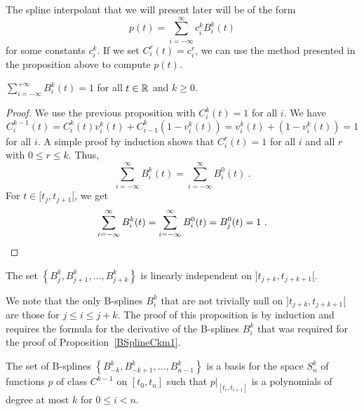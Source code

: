 \begin{rmk}
The spline interpolant that we will present later will be
of the form
\[
  p(t) = \sum_{i=-\infty}^\infty  c_i^k B_i^k(t)
\]
for some constants $c_i^k$.  If we set $C_i^r(t) = c_i^r$, we can use
the method presented in the proposition above to compute $p(t)$.
\end{rmk}

\begin{prop}
$\displaystyle \sum_{i=-\infty}^{+\infty} B_i^k(t) = 1$ for all $t \in \mathbb{R}$
and $k\geq 0$.
\label{Bsplinesum1}
\end{prop}

\begin{proof}
We use the previous proposition with $C_i^k(t) = 1$ for all $i$.  We
have
\[
C_i^{k-1}(t) = C_i^k(t) v_i^k(t) + C_{i-1}^k \left( 1- v_i^k(t)\right)
=  v_i^k(t) + \left( 1-  v_i^k(t)\right) = 1
\]
for all $i$.   A simple proof by induction shows that
$C_i^r(t) = 1$ for all $i$ and all $r$ with $0 \leq r \leq k$.  Thus,
\[
  \sum_{i=-\infty}^\infty B_i^k(t) = \sum_{i=-\infty}^\infty B_i^0(t) \ .
\]
For $t\in [t_j,t_{j+1}[$, we get
\[
  \sum_{i=-\infty}^\infty B_i^k(t) = \sum_{i=-\infty}^\infty B_i^0(t)
  = B_j^0(t) = 1 \ .  \qedhere
\]
\end{proof}

\begin{prop}
The set
$\displaystyle \left\{ B_j^k, B_{j+1}^k, \ldots , B_{j+k}^k \right\}$
is linearly independent on $]t_{j+k},t_{j+k+1}[$.
\end{prop}

We note that the only B-splines $B_i^k$ that are not trivially null on
$]t_{j+k},t_{j+k+1}[$ are those for $j \leq i \leq j+k$.  The proof of
this proposition is by induction and requires the formula for the
derivative of the B-splines $B_i^k$ that was required for the proof
of Proposition~\ref{BSplineCkm1}.

\begin{prop}
The set of B-splines
$\displaystyle \left\{ B_{-k}^k, B_{-k+1}^k, \ldots , B_{n-1}^k \right\}$
is a basis for the space $S_n^k$ of functions $p$ of class $C^{k-1}$ on
$[t_0,t_n]$ such that
$\displaystyle p\big|_{[t_i,t_{i+1}]}$ is a polynomials of degree at most
$k$ for $0\leq i < n$.
\label{BSplineLinInd}
\end{prop}

